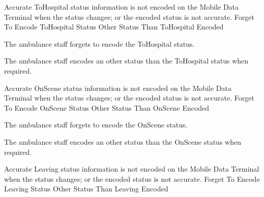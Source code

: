   \startkaosspec
  	 {Accurate ToHospital status information is not encoded on the Mobile Data Terminal when the status changes; or the encoded status is not accurate.}
  	 {Forget To Encode ToHospital Status}
  	 {Other Status Than ToHospital Encoded}
  \stopkaosspec
  
  \startkaosspec
  	 {The ambulance staff forgets to encode the ToHospital status.}
  \stopkaosspec
  
  \startkaosspec
  	 {The ambulance staff encodes an other status than the ToHospital status when required.}
  \stopkaosspec
  
  
    {}
  
  \startkaosspec
  	 {Accurate OnScene status information is not encoded on the Mobile Data Terminal when the status changes; or the encoded status is not accurate.}
  	 {Forget To Encode OnScene Status}
  	 {Other Status Than OnScene Encoded}
  \stopkaosspec
  
  \startkaosspec
  	 {The ambulance staff forgets to encode the OnScene status.}
  \stopkaosspec
  
  \startkaosspec
  	 {The ambulance staff encodes an other status than the OnScene status when required.}
  \stopkaosspec
  
  
    {}
  
  \startkaosspec
  	 {Accurate Leaving status information is not encoded on the Mobile Data Terminal when the status changes; or the encoded status is not accurate.}
  	 {Forget To Encode Leaving Status}
  	 {Other Status Than Leaving Encoded}
  \stopkaosspec
  
